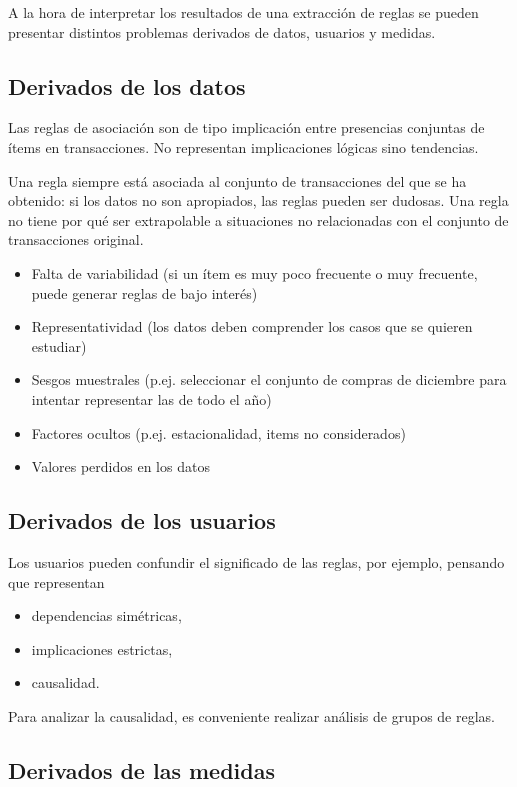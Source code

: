\documentclass[a4paper,11pt,spanish]{report}
\let\stdsub\subsection
\let\stdsubsub\subsubsection
\renewcommand{\section}{\stdsub}
\renewcommand{\subsection}{\stdsubsub}
\begin{document}
A la hora de interpretar los resultados de una extracción de reglas se pueden presentar distintos problemas derivados de datos, usuarios y medidas.

\section{Derivados de los datos}
\label{sec-4-1-1}

Las reglas de asociación son de tipo implicación entre presencias conjuntas de ítems en transacciones. No representan implicaciones lógicas sino tendencias.

Una regla siempre está asociada al conjunto de transacciones del que se ha obtenido: si los datos no son apropiados, las reglas pueden ser dudosas. Una regla no tiene por qué ser extrapolable a situaciones no relacionadas con el conjunto de transacciones original.

\begin{itemize}
\item Falta de variabilidad (si un ítem es muy poco frecuente o muy frecuente, puede generar reglas de bajo interés)
\item Representatividad (los datos deben comprender los casos que se quieren estudiar)
\item Sesgos muestrales (p.ej. seleccionar el conjunto de compras de diciembre para intentar representar las de todo el año)
\item Factores ocultos (p.ej. estacionalidad, items no considerados)
\item Valores perdidos en los datos
\end{itemize}

\section{Derivados de los usuarios}
\label{sec-4-1-2}

Los usuarios pueden confundir el significado de las reglas, por ejemplo, pensando que representan
\begin{itemize}
\item dependencias simétricas,
\item implicaciones estrictas,
\item causalidad.
\end{itemize}

Para analizar la causalidad, es conveniente realizar análisis de grupos de reglas.

\section{Derivados de las medidas}
\label{sec-4-1-3}
\end{document}
